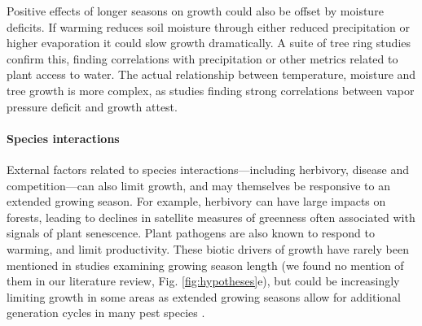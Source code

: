 \documentclass[11pt]{article}
\begin{document}
Positive effects of longer seasons on growth could also be offset by moisture deficits. If warming reduces soil moisture through either reduced precipitation or higher evaporation it could slow growth dramatically. A suite of tree ring studies confirm this, finding correlations with precipitation or other metrics related to plant access to water. The actual relationship between temperature, moisture and tree growth is more complex, as studies finding strong correlations between vapor pressure deficit and growth attest. 

\paragraph{Species interactions} %

External factors related to species interactions---including herbivory, disease and competition---can also limit growth, and may themselves be responsive to an extended growing season. For example, herbivory can have large impacts on forests, leading to declines in satellite measures of greenness often associated with signals of plant senescence. Plant pathogens are also known to respond to warming, and limit productivity. These biotic drivers of growth have rarely been mentioned in studies examining growing season length (we found no mention of them in our literature review, Fig. \ref{fig:hypotheses}e), but could be increasingly limiting growth in some areas as extended growing seasons allow for additional generation cycles in many pest species \citep{mitton2012mountain,lange2006thresholds}.
\end{document}
